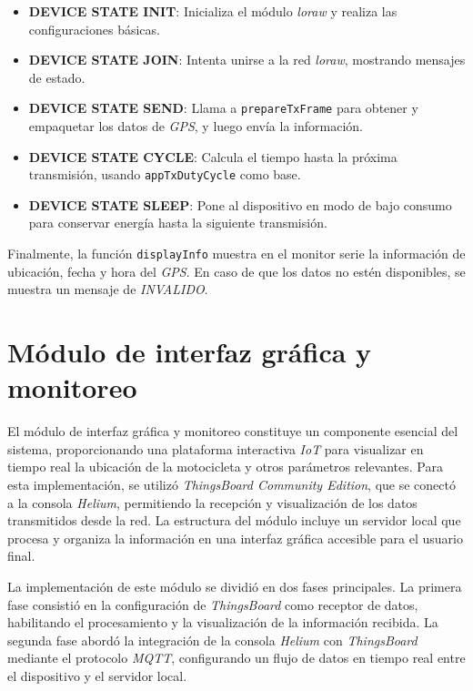 \begin{itemize}
    \item \textbf{DEVICE STATE INIT}: Inicializa el módulo \textit{\acrshort{loraw}} y realiza las configuraciones básicas.
    \item \textbf{DEVICE STATE JOIN}: Intenta unirse a la red \textit{\acrshort{loraw}}, mostrando mensajes de estado.
    \item \textbf{DEVICE STATE SEND}: Llama a \texttt{prepareTxFrame} para obtener y empaquetar los datos de \textit{GPS}, y luego envía la información.
    \item \textbf{DEVICE STATE CYCLE}: Calcula el tiempo hasta la próxima transmisión, usando \texttt{appTxDutyCycle} como base.
    \item \textbf{DEVICE STATE SLEEP}: Pone al dispositivo en modo de bajo consumo para conservar energía hasta la siguiente transmisión.
\end{itemize}

Finalmente, la función \texttt{displayInfo} muestra en el monitor serie la información de ubicación, fecha y hora del \textit{GPS}. En caso de que los datos no estén disponibles, se muestra un mensaje de \textit{INVALIDO}.

\section{Módulo de interfaz gráfica y monitoreo}

El módulo de interfaz gráfica y monitoreo constituye un componente esencial del sistema, proporcionando una plataforma interactiva \textit{IoT} para visualizar en tiempo real la ubicación de la motocicleta y otros parámetros relevantes. Para esta implementación, se utilizó \textit{ThingsBoard Community Edition}, que se conectó a la consola \textit{Helium}, permitiendo la recepción y visualización de los datos transmitidos desde la red. La estructura del módulo incluye un servidor local que procesa y organiza la información en una interfaz gráfica accesible para el usuario final.

La implementación de este módulo se dividió en dos fases principales. La primera fase consistió en la configuración de \textit{ThingsBoard} como receptor de datos, habilitando el procesamiento y la visualización de la información recibida. La segunda fase abordó la integración de la consola \textit{Helium} con \textit{ThingsBoard} mediante el protocolo \textit{MQTT}, configurando un flujo de datos en tiempo real entre el dispositivo y el servidor local.

